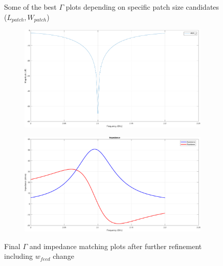 \documentclass[12pt,a4paper]{article}
\begin{document}
{\begin{figure}[h]
\begin{center}
			\caption{\selectfont
				\color{gray}Some of the best $\Gamma$ plots depending on specific patch size candidates ($L_{patch},W_{patch}$)}
		\end{center}  
	\end{figure}
	\begin{figure}[h]
		\begin{center}
			\begin{subfigure}{0.5\linewidth}
				\includegraphics[scale=0.25]{gamma_wfeed.pdf}
			\end{subfigure}
			\begin{subfigure}{0.5\linewidth}
				\includegraphics[scale=0.25]{matching_wfeed.pdf}
			\end{subfigure}
			\caption{\selectfont
				\color{gray}
				Final $\Gamma$ and impedance matching plots after further refinement including $w_{feed}$ change}
		\end{center}  
	\end{figure}
	\begin{figure}[h]
		\begin{center}
			\begin{subfigure}{0.5\linewidth}

\end{subfigure}
\end{center}
\end{figure}}
\end{document}

